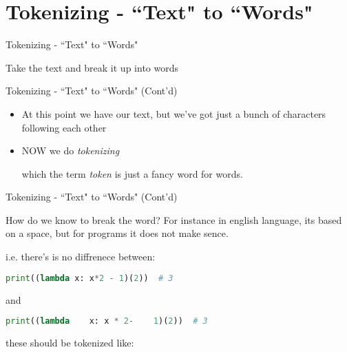 \section{Tokenizing - ``Text" to ``Words"}
\begin{frame}{Tokenizing - ``Text" to ``Words"}
    \begin{itemize}
        {\LARGE \item[-] Take the text and break it up into words}
    \end{itemize}
\end{frame}

\begin{frame}{Tokenizing - ``Text" to ``Words" (Cont'd)}
    \begin{itemize}
        \item[-]<1>
        At this point we have our text, but we’ve got just a bunch of characters following each other
        
        \item[-]<2> NOW we do \textit{tokenizing}
        
        which the term \textit{token} is just a fancy word for words.
    \end{itemize}
\end{frame}

\begin{frame}[fragile]{Tokenizing - ``Text" to ``Words" (Cont'd)}
    \begin{flushleft}
        How do we know to break the word? For instance in english language, its based on a space, but for programs it
        does not make sence. 
        
        i.e. there's is no diffrenece between:
        \begin{lstlisting}[language=python, keywordstyle=\color{Mulberry}\textbf]
            print((lambda x: x*2 - 1)(2))  # 3
        \end{lstlisting}
        and
        \begin{lstlisting}[language=python, keywordstyle=\color{Mulberry}\textbf]
            print((lambda    x: x * 2-    1)(2))  # 3
        \end{lstlisting}
        these should be tokenized like:
    \end{flushleft}
\end{frame}

